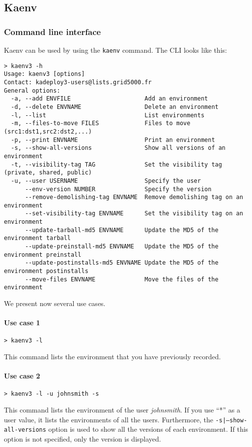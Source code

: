 \documentclass[a4wide,10pt,oneside]{book}
\begin{document}
\subsection{Kaenv}\label{sec:kaenv}
\subsubsection{Command line interface}
Kaenv can be used by using the \texttt{kaenv} command. The CLI looks like this:
\begin{small}
\begin{verbatim}
> kaenv3 -h
Usage: kaenv3 [options]
Contact: kadeploy3-users@lists.grid5000.fr
General options:
  -a, --add ENVFILE                     Add an environment
  -d, --delete ENVNAME                  Delete an environment
  -l, --list                            List environments
  -m, --files-to-move FILES             Files to move (src1:dst1,src2:dst2,...)
  -p, --print ENVNAME                   Print an environment
  -s, --show-all-versions               Show all versions of an environment
  -t, --visibility-tag TAG              Set the visibility tag (private, shared, public)
  -u, --user USERNAME                   Specify the user
      --env-version NUMBER              Specify the version
      --remove-demolishing-tag ENVNAME  Remove demolishing tag on an environment
      --set-visibility-tag ENVNAME      Set the visibility tag on an environment
      --update-tarball-md5 ENVNAME      Update the MD5 of the environment tarball
      --update-preinstall-md5 ENVNAME   Update the MD5 of the environment preinstall
      --update-postinstalls-md5 ENVNAME Update the MD5 of the environment postinstalls
      --move-files ENVNAME              Move the files of the environment

\end{verbatim}
\end{small}

We present now several use cases.
\paragraph{Use case 1}
\begin{verbatim}
> kaenv3 -l
\end{verbatim}
This command lists the environment that you have previously recorded.

\paragraph{Use case 2}
\begin{verbatim}
> kaenv3 -l -u johnsmith -s
\end{verbatim}
This command lists the environment of the user \textit{johnsmith}. If you use ``*'' as a user value, it lists the environments of all the users. Furthermore, the \texttt{-s|--show-all-versions} option is used to show all the versions of each environment. If this option is not specified, only the version is displayed.
\end{document}

